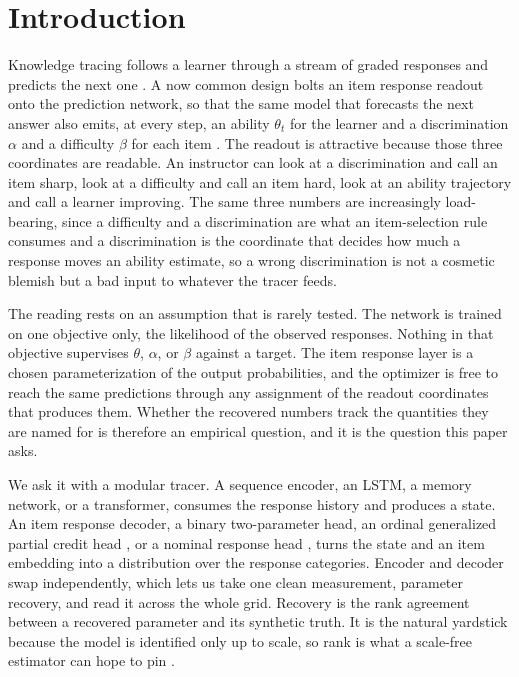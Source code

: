 \documentclass[sigconf,nonacm,screen]{acmart}
\begin{document}
\maketitle

\section{Introduction}
Knowledge tracing follows a learner through a stream of graded responses and
predicts the next one \cite{corbett_knowledge_1994,piech_deep_2015}. A now common
design bolts an item response readout onto the prediction network, so that the
same model that forecasts the next answer also emits, at every step, an ability
$\theta_t$ for the learner and a discrimination $\alpha$ and a difficulty $\beta$
for each item \cite{yeung_deep-irt_2019,converse_irt_kt_2021}. The readout is
attractive because those three coordinates are readable. An instructor can look at
a discrimination and call an item sharp, look at a difficulty and call an item
hard, look at an ability trajectory and call a learner improving. The same three
numbers are increasingly load-bearing, since a difficulty and a discrimination are
what an item-selection rule consumes and a discrimination is the coordinate that
decides how much a response moves an ability estimate, so a wrong discrimination is
not a cosmetic blemish but a bad input to whatever the tracer feeds.

The reading rests on an assumption that is rarely tested. The network is trained
on one objective only, the likelihood of the observed responses. Nothing in that
objective supervises $\theta$, $\alpha$, or $\beta$ against a target. The item
response layer is a chosen parameterization of the output probabilities, and the
optimizer is free to reach the same predictions through any assignment of the
readout coordinates that produces them. Whether the recovered numbers track the
quantities they are named for is therefore an empirical question, and it is the
question this paper asks.

We ask it with a modular tracer. A sequence encoder, an LSTM, a memory network,
or a transformer, consumes the response history and produces a state. An item
response decoder, a binary two-parameter head, an ordinal generalized partial
credit head \cite{van_der_linden_generalized_1997}, or a nominal response head
\cite{bock_estimating_1972}, turns the state and an item embedding into a
distribution over the response categories. Encoder and decoder swap
independently, which lets us take one clean measurement, parameter recovery, and
read it across the whole grid. Recovery is the rank agreement between a recovered
parameter and its synthetic truth. It is the natural yardstick because the model
is identified only up to scale, so rank is what a scale-free estimator can hope to
pin \cite{baker_item_2004}.
\end{document}
